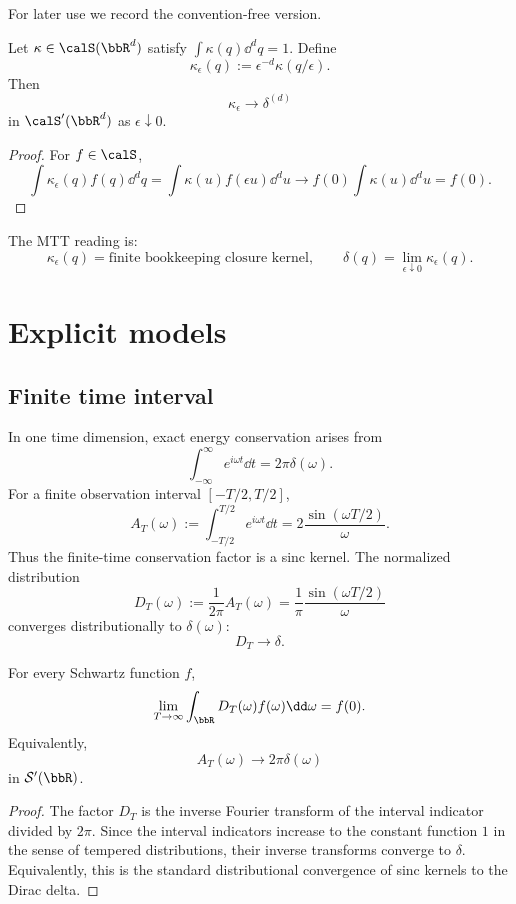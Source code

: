 \documentclass[11pt]{article}
\begin{document}
For later use we record the convention-free version.

\begin{theorem}
Let \(\kappa\in\calS(\bbR^d)\) satisfy \(\int\kappa(q)\dd^dq=1\).  Define
\[
\kappa_\epsilon(q):=\epsilon^{-d}\kappa(q/\epsilon).
\]
Then
\[
\kappa_\epsilon\to\delta^{(d)}
\]
in \(\calS'(\bbR^d)\) as \(\epsilon\downarrow0\).
\end{theorem}

\begin{proof}
For \(f\in\calS\),
\[
\int \kappa_\epsilon(q)f(q)\dd^dq
=
\int \kappa(u)f(\epsilon u)\dd^du
\to
f(0)\int\kappa(u)\dd^du=f(0).
\]
\end{proof}

The MTT reading is:
\[
\boxed{
\kappa_\epsilon(q)=\text{finite bookkeeping closure kernel},
\qquad
\delta(q)=\lim_{\epsilon\downarrow0}\kappa_\epsilon(q).
}
\]

\section{Explicit models}

\subsection{Finite time interval}

In one time dimension, exact energy conservation arises from
\[
\int_{-\infty}^{\infty}e^{i\omega t}\dd t=2\pi\delta(\omega).
\]
For a finite observation interval \([-T/2,T/2]\),
\[
A_T(\omega):=\int_{-T/2}^{T/2}e^{i\omega t}\dd t
=
2\frac{\sin(\omega T/2)}{\omega}.
\]
Thus the finite-time conservation factor is a sinc kernel.  The normalized distribution
\[
D_T(\omega):=\frac{1}{2\pi}A_T(\omega)
=
\frac{1}{\pi}\frac{\sin(\omega T/2)}{\omega}
\]
converges distributionally to \(\delta(\omega)\):
\[
D_T\to\delta.
\]

\begin{proposition}
For every Schwartz function \(f\),
\[
\lim_{T\to\infty}\int_{\bbR}D_T(\omega)f(\omega)\dd\omega=f(0).
\]
Equivalently,
\[
A_T(\omega)\to 2\pi\delta(\omega)
\]
in \(\mathcal S'(\bbR)\).
\end{proposition}

\begin{proof}
The factor \(D_T\) is the inverse Fourier transform of the interval indicator divided by \(2\pi\).  Since the interval indicators increase to the constant function \(1\) in the sense of tempered distributions, their inverse transforms converge to \(\delta\).  Equivalently, this is the standard distributional convergence of sinc kernels to the Dirac delta.
\end{proof}
\end{document}
